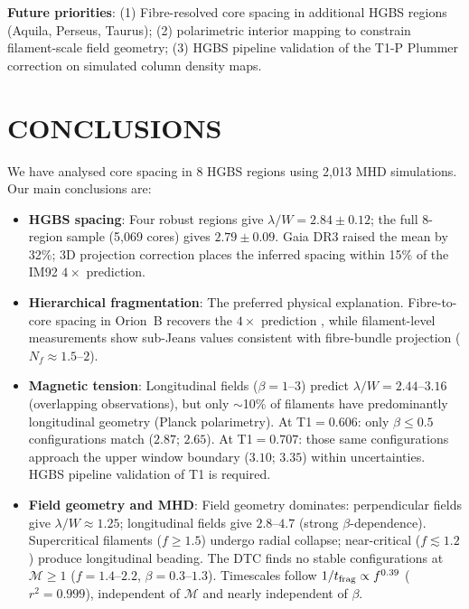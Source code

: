 \documentclass[twoside,twocolumn]{mnras}
\begin{document}
\textbf{Future priorities}:
(1) Fibre-resolved core spacing in additional HGBS regions (Aquila, Perseus, Taurus);
(2) polarimetric interior mapping to constrain filament-scale field geometry;
(3) HGBS pipeline validation of the T1-P Plummer correction on simulated column density maps.

\section{CONCLUSIONS}

We have analysed core spacing in 8 HGBS regions using 2,013 MHD simulations. Our main conclusions are:

\begin{itemize}

    \item \textbf{HGBS spacing}: Four robust regions give $\lambda/W = 2.84 \pm 0.12$; the full 8-region sample (5,069 cores) gives $2.79 \pm 0.09$. Gaia DR3 raised the mean by 32\%; 3D projection correction places the inferred spacing within 15\% of the IM92 $4\times$ prediction.

    \item \textbf{Hierarchical fragmentation}: The preferred physical explanation.
    Fibre-to-core spacing in Orion~B recovers the $4\times$ prediction \citep{Yang2024},
    while filament-level measurements show sub-Jeans values consistent with
    fibre-bundle projection ($N_f \approx 1.5$--$2$).

    \item \textbf{Magnetic tension}: Longitudinal fields ($\beta = 1$--$3$) predict
    $\lambda/W = 2.44$--$3.16$ (overlapping observations), but only $\sim$10\% of
    filaments have predominantly longitudinal geometry (Planck polarimetry).
    At T1$=0.606$: only $\beta \leq 0.5$ configurations match ($2.87$; $2.65$).
    At T1$=0.707$: those same configurations approach the upper window boundary
    ($3.10$; $3.35$) within uncertainties. HGBS pipeline validation of T1 is required.

    \item \textbf{Field geometry and MHD}: Field geometry dominates: perpendicular fields
    give $\lambda/W \approx 1.25$; longitudinal fields give $2.8$--$4.7$ (strong
    $\beta$-dependence). Supercritical filaments ($f \geq 1.5$) undergo radial collapse;
    near-critical ($f \lesssim 1.2$) produce longitudinal beading. The DTC finds no stable
    configurations at $\mathcal{M} \geq 1$ ($f=1.4$--$2.2$, $\beta=0.3$--$1.3$). Timescales
    follow $1/t_{\rm frag} \propto f^{0.39}$ ($r^2 = 0.999$), independent of $\mathcal{M}$
    and nearly independent of $\beta$.


\end{itemize}
\end{document}
